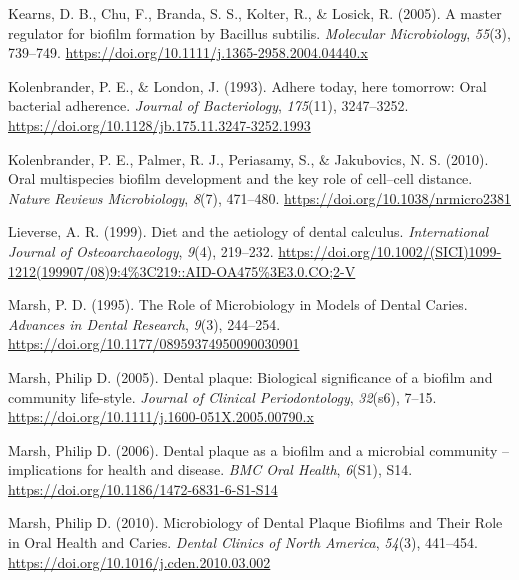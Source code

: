 \documentclass[
  letterpaper,
]{book}
\newlength{\cslhangindent}
\newlength{\cslentryspacingunit} %
\newenvironment{CSLReferences}[2] %
 {%
  \setlength{\parindent}{0pt}
  \ifodd #1
  \let\oldpar\par
  \def\par{\hangindent=\cslhangindent\oldpar}
  \fi
  \setlength{\parskip}{#2\cslentryspacingunit}
 }%
 {}
\begin{document}
\begin{CSLReferences}{1}{0}
\leavevmode{}%
Kearns, D. B., Chu, F., Branda, S. S., Kolter, R., \& Losick, R. (2005).
A master regulator for biofilm formation by {Bacillus} subtilis.
\emph{Molecular Microbiology}, \emph{55}(3), 739--749.
\url{https://doi.org/10.1111/j.1365-2958.2004.04440.x}

\leavevmode{}%
Kolenbrander, P. E., \& London, J. (1993). Adhere today, here tomorrow:
Oral bacterial adherence. \emph{Journal of Bacteriology},
\emph{175}(11), 3247--3252.
\url{https://doi.org/10.1128/jb.175.11.3247-3252.1993}

\leavevmode{}%
Kolenbrander, P. E., Palmer, R. J., Periasamy, S., \& Jakubovics, N. S.
(2010). Oral multispecies biofilm development and the key role of
cell--cell distance. \emph{Nature Reviews Microbiology}, \emph{8}(7),
471--480. \url{https://doi.org/10.1038/nrmicro2381}

\leavevmode{}%
Lieverse, A. R. (1999). Diet and the aetiology of dental calculus.
\emph{International Journal of Osteoarchaeology}, \emph{9}(4), 219--232.
\url{https://doi.org/10.1002/(SICI)1099-1212(199907/08)9:4\%3C219::AID-OA475\%3E3.0.CO;2-V}

\leavevmode{}%
Marsh, P. D. (1995). The {Role} of {Microbiology} in {Models} of {Dental
Caries}. \emph{Advances in Dental Research}, \emph{9}(3), 244--254.
\url{https://doi.org/10.1177/08959374950090030901}

\leavevmode{}%
Marsh, Philip D. (2005). Dental plaque: Biological significance of a
biofilm and community life-style. \emph{Journal of Clinical
Periodontology}, \emph{32}(s6), 7--15.
\url{https://doi.org/10.1111/j.1600-051X.2005.00790.x}

\leavevmode{}%
Marsh, Philip D. (2006). Dental plaque as a biofilm and a microbial
community -- implications for health and disease. \emph{BMC Oral
Health}, \emph{6}(S1), S14.
\url{https://doi.org/10.1186/1472-6831-6-S1-S14}

\leavevmode{}%
Marsh, Philip D. (2010). Microbiology of {Dental Plaque Biofilms} and
{Their Role} in {Oral Health} and {Caries}. \emph{Dental Clinics of
North America}, \emph{54}(3), 441--454.
\url{https://doi.org/10.1016/j.cden.2010.03.002}


\end{CSLReferences}
\end{document}
